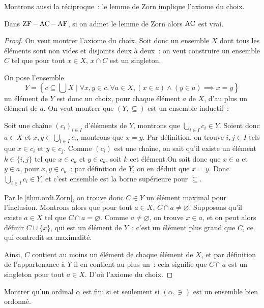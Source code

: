 Montrons aussi la réciproque~: le lemme de Zorn implique l'axiome du choix.

\begin{proposition}
  Dans $\operatorname{ZF} - \operatorname{AC} - \operatorname{AF}$, si on admet le lemme de Zorn alors $\operatorname{AC}$ est vrai.
\end{proposition}

\begin{proof}
  On veut montrer l'axiome du choix. Soit donc un ensemble $X$ dont tous les
  éléments sont non vides et disjoints deux à deux~: on veut construire un
  ensemble $C$ tel que pour tout $x \in X$, $x\cap C$ est un singleton.

  On pose l'ensemble
  \[Y = \left\{c \subseteq \bigcup X\mid \forall x,y \in c, \forall a \in X,
  (x \in a)\land (y \in a) \implies x = y\right\}\]
  un élément de $Y$ est donc un choix, pour chaque élément $a$ de $X$, d'au plus
  un élément de $a$. On veut montrer que $(Y,\subseteq)$ est un ensemble
  inductif~:

  Soit une chaîne $(c_i)_{i\in I}$ d'éléments de $Y$, montrons que
  $\displaystyle\bigcup_{i\in I} c_i\in Y$. Soient donc $a\in X$ et
  $x,y\in\displaystyle\bigcup_{i \in I} c_i$, montrons que $x = y$.
  Par définition, on trouve $i,j \in I$ tels que $x \in c_i$ et $y\in c_j$.
  Comme $(c_i)$ est une chaîne, on sait qu'il existe un élément $k\in\{i,j\}$
  tel que $x\in c_k$ et $y\in c_k$, soit $k$ cet élément.On sait donc que
  $x\in a$ et $y\in a$, pour $x,y\in c_k$~: par définition de $Y$, on en
  déduit que $x = y$. Donc $\displaystyle\bigcup_{i\in I} c_i\in Y$, et
  c'est ensemble est la borne supérieure pour $\subseteq$.

  Par le \cref{thm.ordi.Zorn}, on trouve donc $C \in Y$ un élément maximal pour
  l'inclusion. Montrons alors que pour tout $a \in X$,
  $C \cap a \neq\varnothing$. Supposons qu'il existe $a \in X$ tel que
  $C\cap a = \varnothing$. Comme $a\neq\varnothing$, on trouve $x \in a$, et
  on peut alors définir $C \cup \{x\}$, qui est un élément de $Y$~: c'est un
  élément plus grand que $C$, ce qui contredit sa maximalité.

  Ainsi, $C$ contient au moins un élément de chaque élément de $X$, et par
  définition de l'appartenance à $Y$ il en contient au plus un~: cela signifie
  que $C\cap a$ est un singleton pour tout $a \in X$. D'où l'axiome du choix.
\end{proof}

\begin{exercise}
  Montrer qu'un ordinal $\alpha$ est fini si et seulement si $(\alpha,\ni)$ est
  un ensemble bien ordonné.
\end{exercise}

